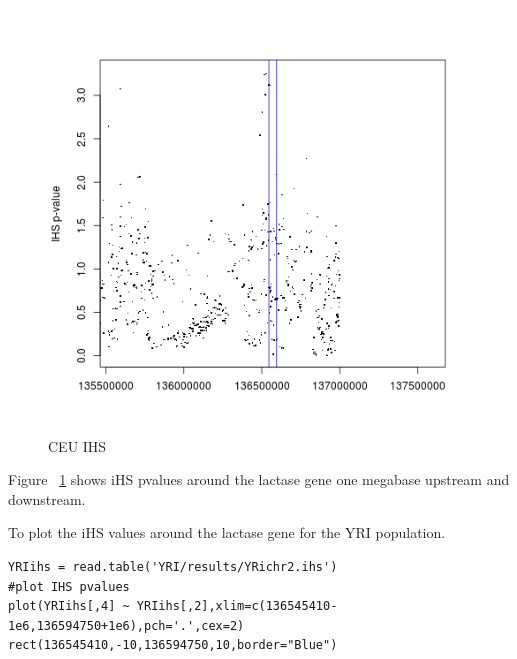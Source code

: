 \documentclass[a4paper,10pt]{article}
\begin{document}
\begin{figure}
\centering
\includegraphics{pictures/CEUihs.png}
\caption{CEU IHS}
\label{fig:ceuihs}
\end{figure}

Figure ~\ref{fig:ceuihs} shows iHS pvalues around the lactase gene one megabase upstream and downstream.

To plot the iHS values around the lactase gene for the YRI population.\\
\begin{verbatim}
YRIihs = read.table('YRI/results/YRichr2.ihs')
#plot IHS pvalues
plot(YRIihs[,4] ~ YRIihs[,2],xlim=c(136545410-1e6,136594750+1e6),pch='.',cex=2)
rect(136545410,-10,136594750,10,border="Blue") 
\end{verbatim}
\end{document}
